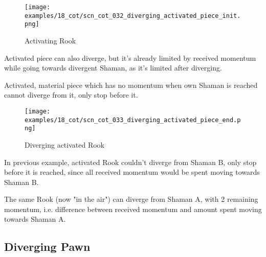 \vspace*{-1.4\baselineskip}
\noindent
\begin{figure}[!h]
\texttt{[image: examples/18\_cot/scn\_cot\_032\_diverging\_activated\_piece\_init.png]}
\vspace*{-1.3\baselineskip}
\caption{Activating Rook}
\label{fig:scn_cot_032_diverging_activated_piece_init}
\end{figure}

\vspace*{-0.4\baselineskip}
Activated piece can also diverge, but it's already limited by received momentum
while going towards divergent Shaman, as it's limited after diverging.

Activated, material piece which has no momentum when own Shaman is reached cannot
diverge from it, only stop before it.

\clearpage %

\vspace*{-2.1\baselineskip}
\noindent
\begin{figure}[!h]
\texttt{[image: examples/18\_cot/scn\_cot\_033\_diverging\_activated\_piece\_end.png]}
\vspace*{-1.3\baselineskip}
\caption{Diverging activated Rook}
\label{fig:scn_cot_033_diverging_activated_piece_end}
\end{figure}

\vspace*{-0.4\baselineskip}
In previous example, activated Rook couldn't diverge from Shaman B, only stop before
it is reached, since all received momentum would be spent moving towards Shaman B.

The same Rook (now "in the air") can diverge from Shaman A, with 2 remaining momentum,
i.e. difference between received momentum and amount spent moving towards Shaman A.

\clearpage %

\subsection*{Diverging Pawn}
\label{sec:Conquest of Tlalocan/Divergence/Diverging Pawn/2} %


